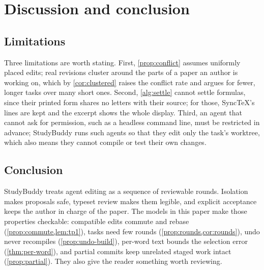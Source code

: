\section{Discussion and conclusion}
\label{sec:conclusion}

\subsection{Limitations}

Three limitations are worth stating. First, \cref{prop:conflict} assumes
uniformly placed edits; real revisions cluster around the parts of a paper an
author is working on, which by \cref{cor:clustered} raises the conflict rate
and argues for fewer, longer tasks over many short ones. Second,
\cref{alg:settle} cannot settle formulas, since their printed form shares no
letters with their source; for those, SyncTeX's lines are kept and the excerpt
shows the whole display. Third, an agent that cannot ask for permission, such
as a headless command line, must be restricted in advance; StudyBuddy runs such
agents so that they edit only the task's worktree, which also means they cannot
compile or test their own changes.

\subsection{Conclusion}

StudyBuddy treats agent editing as a sequence of reviewable rounds. Isolation
makes proposals safe, typeset review makes them legible, and explicit
acceptance keeps the author in charge of the paper. The models in this paper
make those properties checkable: compatible edits commute and rebase
(\cref{prop:commute,lem:tp1}), tasks need few rounds
(\cref{prop:rounds,cor:rounds}), undo never recompiles
(\cref{prop:undo-build}), per-word text bounds the selection error
(\cref{thm:per-word}), and partial commits keep unrelated staged work intact
(\cref{prop:partial}). They also give the reader something worth reviewing.
